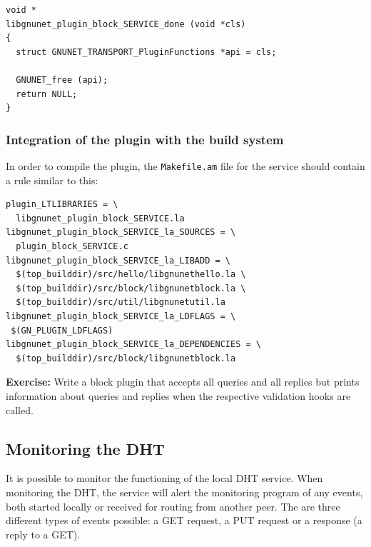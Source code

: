 \documentclass[10pt]{article}
\newcommand{\exercise}[1]{\noindent\begin{boxedminipage}{\textwidth}{\bf Exercise:} #1 \end{boxedminipage}}
\begin{document}
\lstset{language=C}
\begin{lstlisting}
void *
libgnunet_plugin_block_SERVICE_done (void *cls)
{
  struct GNUNET_TRANSPORT_PluginFunctions *api = cls;

  GNUNET_free (api);
  return NULL;
}
\end{lstlisting}


\subsubsection{Integration of the plugin with the build system}

In order to compile the plugin, the {\tt Makefile.am} file for the
service should contain a rule similar to this:

\lstset{language=make}
\begin{lstlisting}
plugin_LTLIBRARIES = \
  libgnunet_plugin_block_SERVICE.la
libgnunet_plugin_block_SERVICE_la_SOURCES = \
  plugin_block_SERVICE.c
libgnunet_plugin_block_SERVICE_la_LIBADD = \
  $(top_builddir)/src/hello/libgnunethello.la \
  $(top_builddir)/src/block/libgnunetblock.la \
  $(top_builddir)/src/util/libgnunetutil.la
libgnunet_plugin_block_SERVICE_la_LDFLAGS = \
 $(GN_PLUGIN_LDFLAGS)
libgnunet_plugin_block_SERVICE_la_DEPENDENCIES = \
  $(top_builddir)/src/block/libgnunetblock.la
\end{lstlisting}


\exercise{Write a block plugin that accepts all queries
and all replies but prints information about queries and replies
when the respective validation hooks are called.}



\subsection{Monitoring the DHT}
It is possible to monitor the functioning of the local DHT service. When monitoring
the DHT, the service will alert the monitoring program of any events,
both started locally or received for routing from another peer. The are three different
types of events possible: a GET request, a PUT request or a response (a reply to
a GET).
\end{document}
